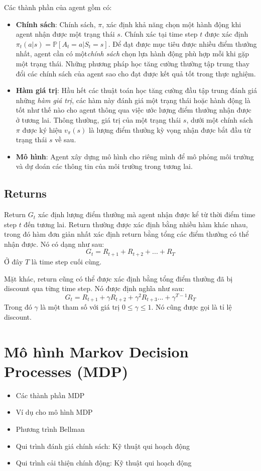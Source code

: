 	Các thành phần của agent gồm có:
	\begin{itemize}
		\item \textbf{Chính sách}: Chính sách, $\pi$, xác định khả năng chọn một hành động khi agent nhận được một trạng thái $s$. Chính xác tại time step $t$ được xác định $\pi_t(a|s) = \mathbb{P}[\mathit{A_t} = a|\mathit{S_t} = s]$. Để đạt được mục tiêu được nhiều điểm thưởng nhất, agent cần có một\textit{chính sách} chọn lựa hành động phù hợp mỗi khi gặp một trạng thái. Những phương pháp học tăng cường thường tập trung thay đổi các chính sách của agent sao cho đạt được kết quả tốt trong thực nghiệm.
		\item \textbf{Hàm giá trị}: Hầu hết các thuật toán học tăng cường đầu tập trung đánh giá những \textit{hàm giá trị}, các hàm này đánh giá một trạng thái hoặc hành động là tốt như thế nào cho agent thông qua việc ước lượng điểm thưởng nhận được ở tương lai. Thông thường, giá trị của một trạng thái $s$, dưới một chính sách $\pi$  được ký hiệu $v_{\pi}(s)$ là lượng điểm thưởng kỳ vọng nhận được bắt đầu từ trạng thái $s$ về sau.
		\item \textbf{Mô hình}: Agent xây dựng mô hình cho riêng mình để mô phỏng môi trường và dự doán các thông tin của môi trường trong tương lai.
	\end{itemize}	
	
	\subsection{Returns}
	Return $\mathit{G_t}$ xác định lượng điểm thưởng mà agent nhận được kể từ thời điểm time step $t$ đến tương lai. Return thường được xác định bằng nhiều hàm khác nhau, trong đó hàm đơn giản nhất xác định return bằng tổng các điểm thưởng có thể nhận được. Nó có dạng như sau:
	$$\mathit{G_t} = \mathit{R_{t+1}} + \mathit{R_{t+2}} + ... + \mathit{R_{T}}$$
	Ở đây $T$ là time step cuối cùng.
	
	Mặt khác, return cũng có thể được xác định bằng tổng điểm thưởng đã bị discount qua từng time step. Nó được định nghĩa như sau:
	$$\mathit{G_t} = \mathit{R_{t+1}} + \gamma\mathit{R_{t+2}} + \gamma^{2}\mathit{R_{t+3}}... + \gamma^{T-1}\mathit{R_{T}}$$
	Trong đó $\gamma$ là một tham số với giá trị $0\leqslant \gamma \leqslant 1$. Nó cũng được gọi là tỉ lệ discount.
	
	
	
	
	
\section{Mô hình Markov Decision Processes (MDP)}
	\begin{itemize}
			\item Các thành phần MDP
			\item Ví dụ cho mô hình MDP
			\item Phương trình Bellman
			\item Qui trình đánh giá chính sách: Kỹ thuật qui hoạch động
			\item Qui trình cải thiện chính động: Kỹ thuật qui hoạch động
	\end{itemize}

